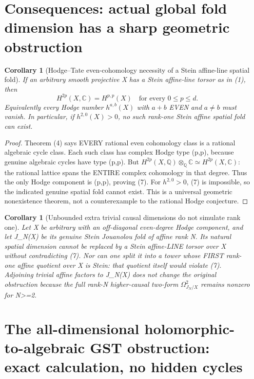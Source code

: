 \documentclass[11pt]{article}
\newtheorem{corollary}[theorem]{Corollary}
\begin{document}
\section{Consequences: actual global fold dimension has a sharp geometric obstruction}
\begin{corollary}[Hodge--Tate even-cohomology necessity of a Stein affine-line spatial fold]
If an arbitrary smooth projective X has a Stein
affine-line torsor as in (1), then
\[
  \boxed{H^{2p}(X,\mathbb C)=H^{p,p}(X)
       \quad\text{for every }0\le p\le d.}            \tag{7}
\]
Equivalently every Hodge number
$h^{a,b}(X)$ with $a+b$ EVEN and $a\ne b$ must vanish.
In particular, if $h^{2,0}(X)>0$, no such rank-one
Stein affine spatial fold can exist.
\end{corollary}
\begin{proof}
Theorem (4) says EVERY rational even cohomology class
is a rational algebraic cycle class. Each such
class has complex Hodge type (p,p), because genuine
algebraic cycles have type (p,p). But
$H^{2p}(X,\mathbb Q)\otimes_{\mathbb Q}\mathbb C
 \simeq H^{2p}(X,\mathbb C)$:
the rational lattice spans the ENTIRE complex
cohomology in that degree. Thus the only Hodge
component is (p,p), proving (7).
For $h^{2,0}>0$, (7) is impossible,
so the indicated genuine spatial fold cannot exist.
This is a universal geometric nonexistence theorem,
not a counterexample to the rational Hodge conjecture.
\end{proof}

\begin{corollary}[Unbounded extra trivial causal dimensions do not simulate rank one]
Let X be arbitrary with an off-diagonal even-degree Hodge
component, and let J_N(X) be its genuine Stein Jouanolou
fold of affine rank N. Its natural spatial dimension cannot
be replaced by a Stein affine-LINE torsor over X
without contradicting (7). Nor can one split it into
a tower whose FIRST rank-one affine quotient over X
is Stein: that quotient itself would violate (7).
Adjoining trivial affine factors to J_N(X)
does not change the original obstruction because the
full rank-N higher-causal two-form
$\Omega^2_{J_N/X}$ remains nonzero for N>=2.
\end{corollary}

\section{The all-dimensional holomorphic-to-algebraic GST obstruction: exact calculation, no hidden cycles}
\end{document}
